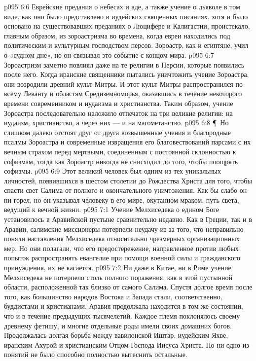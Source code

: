\vs p095 6:6 Еврейские предания о небесах и аде, а также учение о дьяволе в том виде, как оно было представлено в иудейских священных писаниях, хотя и было основано на существовавших преданиях о Люцифере и Калигастии, проистекало, главным образом, из зороастризма во времена, когда евреи находились под политическим и культурным господством персов. Зороастр, как и египтяне, учил о «судном дне», но он связывал это событие с концом мира.
\vs p095 6:7 Зороастризм заметно повлиял даже на те религии в Персии, которые появились после него. Когда иранские священники пытались уничтожить учение Зороастра, они возродили древний культ Митры. И этот культ Митры распространился по всему Леванту и областям Средиземноморья, оказавшись в течение некоторого времени современником и иудаизма и христианства. Таким образом, учение Зороастра последовательно наложило отпечаток на три великие религии: на иудаизм, христианство, а через них --- и на магометанство.
\vs p095 6:8 \P\ Но слишком далеко отстоят друг от друга возвышенные учения и благородные псалмы Зороастра и современные извращения его благовествований парсами с их вечным страхом перед мертвыми, соединенным с постоянной склонностью к софизмам, тогда как Зороастр никогда не снисходил до того, чтобы поощрять софизмы.
\vs p095 6:9 Этот великий человек был одним из тех уникальных личностей, появившихся в шестом столетии до Рождества Христа для того, чтобы спасти свет Салима от полного и окончательного уничтожения. Как бы слабо он ни горел, но он указывал человеку в его мире, окутанном мраком, путь света, ведущий к вечной жизни.
\vs p095 7:1 Учение Мелхиседека о едином Боге установилось в Аравийской пустыне сравнительно недавно. Как в Греции, так и в Аравии, салимские миссионеры потерпели неудачу из\hyp{}за того, что неправильно поняли наставления Мелхиседека относительно чрезмерных организационных мер. Но они полагали, что его предостережение, направленное против любых попыток распространять евангелие при помощи военной силы и гражданского принуждения, их не касается.
\vs p095 7:2 Ни даже в Китае, ни в Риме учение Мелхиседека не потерпело столь полного поражения, как в этой пустынной области, расположенной так близко от самого Салима. Спустя долгое время после того, как большинство народов Востока и Запада стали, соответственно, буддистами и христианами, Аравия продолжала находится в том же состоянии, что и в течение предыдущих тысячелетий. Каждое племя поклонялось своему древнему фетишу, и многие отдельные роды имели своих домашних богов. Продолжалась долгая борьба между вавилонской Иштар, иудейским Яхве, иранским Ахурой и христианским Отцом Господа Иисуса Христа. Но ни одно из понятий не было способно полностью вытеснить остальные.

